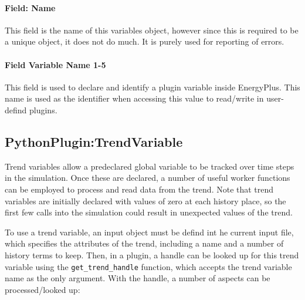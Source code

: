 \paragraph{Field: Name}

This field is the name of this variables object, however since this is required to be a unique object, it does not do much.
It is purely used for reporting of errors.

\paragraph{Field Variable Name 1-5}

This field is used to declare and identify a plugin variable inside EnergyPlus.
This name is used as the identifier when accessing this value to read/write in user-defind plugins.

\subsection{PythonPlugin:TrendVariable}

Trend variables allow a predeclared global variable to be tracked over time steps in the simulation.
Once these are declared, a number of useful worker functions can be employed to process and read data from the trend.
Note that trend variables are initially declared with values of zero at each history place, so the first few calls into the simulation could result in unexpected values of the trend.

To use a trend variable, an input object must be defind int he current input file, which specifies the attributes of the trend, including a name and a number of history terms to keep.
Then, in a plugin, a handle can be looked up for this trend variable using the \verb=get_trend_handle= function, which accepts the trend variable name as the only argument.
With the handle, a number of aspects can be processed/looked up:

